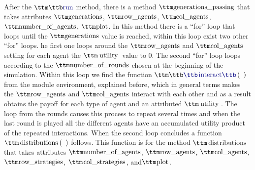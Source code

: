 After the $\pythoninline{run}$ method, there is a method $\pythoninline{generations\_passing}$ that takes attributes $\pythoninline{generations}$,  $\pythoninline{row\_agents}$, $\pythoninline{col\_agents}$, $\pythoninline{number\_of\_agents}$, $\pythoninline{ plot}$. In this method there is a ``for'' loop that loops until the $\pythoninline{generations}$ value is reached, within this loop exist two other ``for'' loops.
 he first one loops around the $\pythoninline{row\_agents}$ and  $\pythoninline{col\_agents}$ setting for each agent  the $\pythoninline{utility}$ value to 0. 
The second ``for'' loop loops according to the $\pythoninline{number\_of\_rounds}$ chosen at the beginning of the simulation. Within this loop we find the function $\pythoninline{interact( )}$ from the module environment, explained before, which in general terms makes the $\pythoninline{row\_agents}$ and $\pythoninline{col\_agents}$ interact with each other and as a result obtains the payoff for each type of agent and an attributed $\pythoninline{utility}$. The loop from the rounds causes this process to repeat several times and when the last round is played all the different agents have an accumulated utility product of the repeated interactions.
When the second loop concludes a function $\pythoninline{distributions( )}$ follows. This function is for the method $\pythoninline{distributions}$ that takes attributes $\pythoninline{number\_of\_agents}$, $\pythoninline{ row\_agents}$, $\pythoninline{col\_agents}$, $\pythoninline{row\_strategies}$, $\pythoninline{col\_strategies}$, and$\pythoninline{ plot}$.

